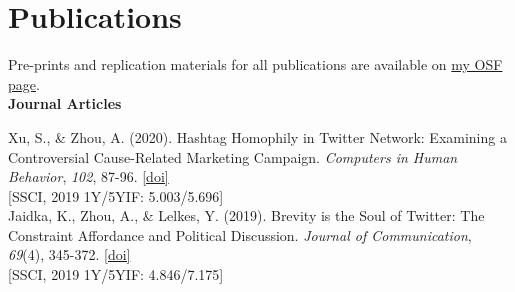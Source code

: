 \documentclass[12pt, letterpaper]{article}
\newcommand{\doi}[1]{\href{#1}{{[doi]}}}
\newcommand{\years}[1]{\marginnote{\normalsize #1}}
\begin{document}
\section*{Publications}
\vspace{-12pt}
{\footnotesize \text{*} Pre-prints and replication materials for all publications are available on \href{https://osf.io/utdaf/}{my OSF page}.}\\

\textbf{Journal Articles}

  \years{[3]} Xu, S., \& Zhou, A. (2020). Hashtag Homophily in Twitter Network: Examining a Controversial Cause-Related Marketing Campaign. \textit{Computers in Human Behavior}, \textit{102}, 87-96. \doi{https://doi.org/10.1016/j.chb.2019.08.006}\\
  \years{} {[SSCI, 2019 1Y/5YIF: 5.003/5.696]}\\
  \years{[2]} Jaidka, K., Zhou, A., \& Lelkes, Y. (2019). Brevity is the Soul of Twitter: The Constraint Affordance and Political Discussion. \textit{Journal of Communication}, \textit{69}(4), 345-372. \doi{https://doi.org/10.1093/joc/jqz023}\\
  \years{} {[SSCI, 2019 1Y/5YIF: 4.846/7.175]}\\
\end{document}
